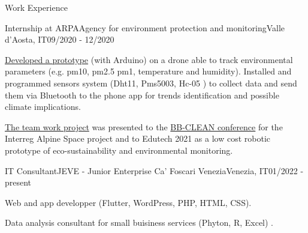\documentclass{article}
\newlength{\tabin}
\newlength{\secsep}
\newcommand{\lineunder}{\vspace*{-8pt} \\ \hspace*{-6pt} \hrulefill \\ \vspace*{-15pt}}
\newenvironment{tabbedsection}[1]{
  \begin{list}{}{
      \setlength{\itemsep}{0pt}
      \setlength{\labelsep}{0pt}
      \setlength{\labelwidth}{0pt}
      \setlength{\leftmargin}{\tabin}
      \setlength{\rightmargin}{\tabin}
      \setlength{\listparindent}{0pt}
      \setlength{\parsep}{0pt}
      \setlength{\parskip}{0pt}
      \setlength{\partopsep}{0pt}
      \setlength{\topsep}{#1}
    }
  \item[]
}{\end{list}}
\newenvironment{resume_section}[1]{
  \filbreak
  \vspace{2\secsep}
  \textsc{\large#1}
  \lineunder
  \begin{tabbedsection}{\secsep}
}{\end{tabbedsection}}
\newenvironment{subitems}{
  \renewcommand{\labelitemi}{-}
  \begin{itemize}
      \setlength{\labelsep}{1em}
}{\end{itemize}}
\newenvironment{resume_employer}[4]{
  \vspace{\secsep}
  \textbf{#1} \\ 
  \indent {\small #2} \hfill {\footnotesize#3 (#4)}
  \begin{tabbedsection}{0pt}
  \begin{subitems}
}{\end{subitems}\end{tabbedsection}}
\begin{document}
\begin{resume_section}{Work Experience}
  \begin{resume_employer}{Internship at ARPA}{Agency for environment protection and monitoring}{Valle d'Aosta, IT}{09/2020 - 12/2020}
    \item \href{https://www.snpambiente.it/2020/11/11/la-scienza-vola-in-una-scatola-di-biscotti/}{Developed a prototype} (with Arduino) on a drone able to track environmental parameters (e.g. pm10, pm2.5 pm1, temperature and humidity). Installed and programmed sensors system (Dht11, Pms5003, Hc-05 ) to collect data and send them via Bluetooth to the phone app for trends identification and possible climate
implications.
    \item \href{https://www.arpa.vda.it/it/archivio-news/3500-creativit\%5Cunhbox\%20\%5Cvoidb@x\%20\%5Cbgroup\%20\%5Clet\%20\%5Cunhbox\%20\%5Cvoidb@x\%20\%5Csetbox\%20\%5C@tempboxa\%20\%5Chbox\%20\%7Ba\%5Cglobal\%20\%5Cmathchardef\%20\%5Caccent@spacefactor\%20\%5Cspacefactor\%20\%7D\%5Clet\%20\%5Cbegingroup\%20\%5Cendgroup\%20\%5Crelax\%20\%5Clet\%20\%5Cignorespaces\%20\%5Crelax\%20\%5Caccent\%2018\%20a\%5Cegroup\%20\%5Cspacefactor\%20\%5Caccent@spacefactor\%20-e-ingegno-a-braccetto-con-la-scienxza-citizen-science/}{The team work project} was presented to the \href{https://www.arpa.vda.it/it/archivio-news/3434-riscaldamento-a-legna-tra-cambiamenti-climatici-e-qualit\%5Cunhbox\%20\%5Cvoidb@x\%20\%5Cbgroup\%20\%5Clet\%20\%5Cunhbox\%20\%5Cvoidb@x\%20\%5Csetbox\%20\%5C@tempboxa\%20\%5Chbox\%20\%7Ba\%5Cglobal\%20\%5Cmathchardef\%20\%5Caccent@spacefactor\%20\%5Cspacefactor\%20\%7D\%5Clet\%20\%5Cbegingroup\%20\%5Cendgroup\%20\%5Crelax\%20\%5Clet\%20\%5Cignorespaces\%20\%5Crelax\%20\%5Caccent\%2018\%20a\%5Cegroup\%20\%5Cspacefactor\%20\%5Caccent@spacefactor\%20-dell\%5COT1\%5Ctextquoteright\%20aria-quanto-ne-sappiamo-ne-abbiamo-parlato-con-luca-mercalli}{ BB-CLEAN conference} for the Interreg Alpine Space project
and to Edutech 2021 as a low cost robotic prototype of eco-sustainability and environmental monitoring.

    
  \end{resume_employer}
  
  \begin{resume_employer}{IT Consultant}{JEVE - Junior Enterprise Ca’ Foscari Venezia}{Venezia, IT}{01/2022 - present}
    \item Web and app developper (Flutter, WordPress, PHP, HTML, CSS).
   \item Data analysis consultant for small buisiness services (Phyton, R, Excel) .
  \end{resume_employer}
  

\end{resume_section}
\end{document}
